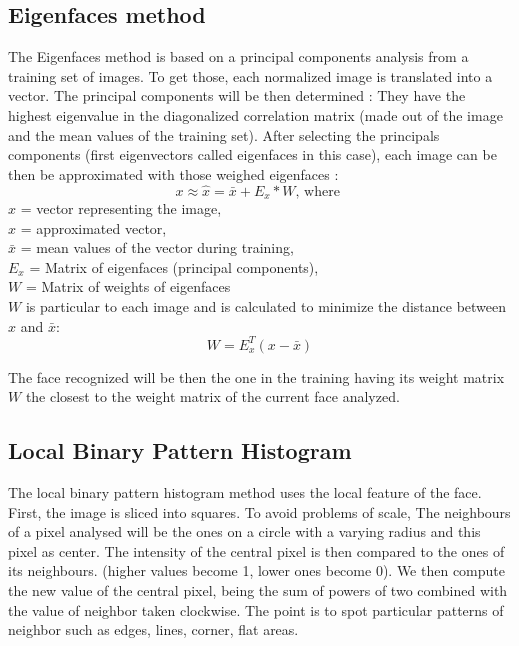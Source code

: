 \subsection{Eigenfaces method}

The Eigenfaces method is based on a principal components analysis from a training set of images. To get those, each normalized image is translated into a vector. The principal components will be then determined : They have the highest eigenvalue in the diagonalized correlation matrix (made out of the image and the mean values of the training set). After selecting the principals components (first eigenvectors called eigenfaces in this case), each image can be then be approximated with those weighed eigenfaces :
\begin{equation}
x \approx  \hat{x} = \bar{x} + E_{x} * W \textrm{, where } 
\end{equation}
$x$ = vector representing the image,\\
$\hat{x}$ = approximated vector,\\
$\bar{x}$ = mean values of the vector during training,\\
$E_{x}$ = Matrix of eigenfaces (principal components),\\
$W$ = Matrix of weights of eigenfaces\\

$W$ is particular to each image and is calculated to minimize the distance between $x$ and $\bar{x}$:
\begin{equation}
W = E_{x}^T (x-\bar{x}) 
\end{equation}

The face recognized will be then the one in the training having its weight matrix $W$ the closest to the weight matrix of the current face analyzed. 

\subsection{Local Binary Pattern Histogram}

The local binary pattern histogram method uses the local feature of the face. First, the image is sliced into squares.
To avoid problems of scale, The neighbours of a pixel analysed will be the ones on a circle with a varying radius and this pixel as center.
The intensity of the central pixel is then compared to the ones of its neighbours. (higher values become 1, lower ones become 0).
We then compute the new value of the central pixel, being the sum of powers of two combined with the value of neighbor taken clockwise. The point is to spot particular patterns of neighbor such as edges, lines, corner, flat areas.

